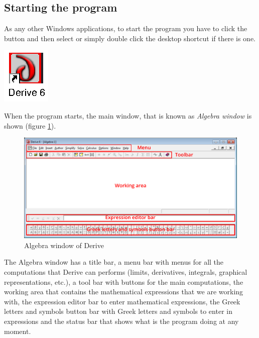 \subsection*{Starting the program}
As any other Windows applications, to start the program you have to click the  button and then select  or simply double click the desktop shortcut if there is one. 


\begin{center}
\includegraphics[scale=0.4]{img/introduction/derive_icon}
\end{center}

When the program starts, the main window, that is known as \emph{Algebra window} is shown (figure \ref{g:main}).

\begin{figure}[h!]
\begin{center}
\includegraphics[width=\textwidth]{img/introduction/algebra_window}
\caption{Algebra window of Derive} \label{g:main} 
\end{center}
\end{figure}


The Algebra window has a title bar, a menu bar with menus for all the computations that Derive can performs (limits, derivatives, integrals, graphical representations, etc.), a tool bar with buttons for the main computations, the working area that contains the mathematical expressions that we are working with, the expression editor bar to enter mathematical expressions, the Greek letters and symbols button bar with Greek letters and symbols to enter in expressions and the status bar that shows what is the program doing at any moment. 

